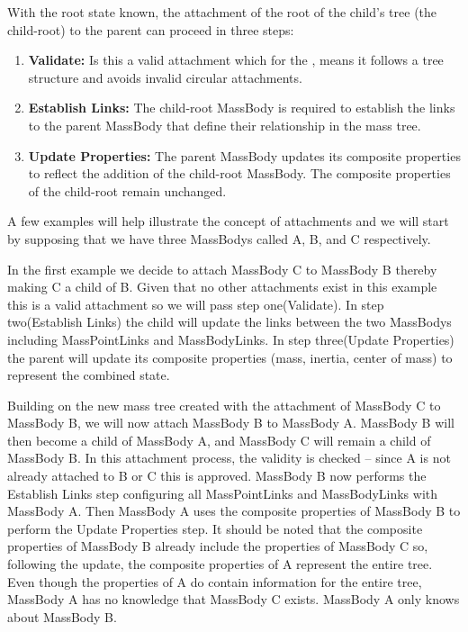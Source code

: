 With the root state known, the attachment of the root of the child's tree (the 
child-root) to the parent can proceed in three steps:
\begin{enumerate}
\item{\bf Validate:} Is this a valid attachment which for the \ModelDesc, 
means it follows a tree structure and avoids 
invalid circular attachments.
\item{\bf Establish Links:} The child-root MassBody is required to establish 
the links to the parent MassBody that define their 
relationship in the mass tree.
\item{\bf Update Properties:}  The parent MassBody updates its composite 
properties to reflect the addition of the child-root MassBody.  
The composite properties of the child-root remain unchanged.
\end{enumerate}
 
A few examples will help illustrate the concept of attachments and we will 
start by supposing that we have three MassBodys called 
A, B, and C respectively.

In the first example we decide to attach MassBody C to MassBody B thereby 
making C a child of B.  Given that no other attachments exist in
this example this is a valid attachment so we will pass step one(Validate).  
In step two(Establish Links) the child will update the 
links between the two MassBodys including MassPointLinks and MassBodyLinks.  
In step three(Update Properties) the parent will 
update its composite properties (mass, inertia, center of mass) to represent 
the combined state.

Building on the new mass tree created with the attachment of MassBody C to 
MassBody B, we will now attach MassBody B to MassBody A. 
MassBody B will then become a child of MassBody A, and MassBody C will remain 
a child of MassBody B.  In this attachment process, the validity is checked -- 
since A is not already attached to B or C this is approved.  MassBody B now 
performs the Establish Links step configuring all MassPointLinks and 
MassBodyLinks with MassBody A.  Then MassBody A uses the composite properties 
of MassBody B to perform the Update Properties step.  It should be noted that 
the
composite properties of MassBody B already include the properties of
MassBody C so, following the update, the composite properties of A represent 
the entire tree.
Even though the properties of A do contain information for the entire tree, 
MassBody A has no knowledge that
MassBody C exists.  MassBody A only knows about MassBody B.

